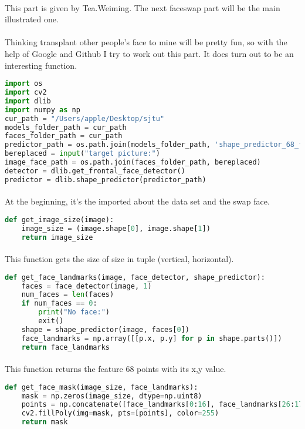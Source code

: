 \documentclass{article}
\begin{document}
	    	\paragraph{}This part is given by Tea.Weiming. The next faceswap part will be the main illustrated one. 
		\paragraph{}Thinking transplant other people's face to mine will be pretty fun, so with the help of Google and Github I try to work out this part. It does turn out to be an interesting function. 
	      \begin{lstlisting}[language=Python]
import os
import cv2
import dlib
import numpy as np
cur_path = "/Users/apple/Desktop/sjtu"
models_folder_path = cur_path
faces_folder_path = cur_path
predictor_path = os.path.join(models_folder_path, 'shape_predictor_68_face_landmarks.dat')
bereplaced = input("target picture:")
image_face_path = os.path.join(faces_folder_path, bereplaced)  
detector = dlib.get_frontal_face_detector()
predictor = dlib.shape_predictor(predictor_path)
		\end{lstlisting}
		\paragraph{}At the beginning, it's the imported about the data set and the swap face.
		\begin{lstlisting}[language=Python]
def get_image_size(image):
    image_size = (image.shape[0], image.shape[1])
    return image_size
		\end{lstlisting}
		\paragraph{}This function gets the size of size in tuple (vertical, horizontal). 
		\begin{lstlisting}[language=Python]
def get_face_landmarks(image, face_detector, shape_predictor):
    faces = face_detector(image, 1)
    num_faces = len(faces)
    if num_faces == 0:
        print("No face:")
        exit()
    shape = shape_predictor(image, faces[0])
    face_landmarks = np.array([[p.x, p.y] for p in shape.parts()])
    return face_landmarks
		\end{lstlisting}
		\paragraph{}This function returns the feature 68 points with its x,y value. 
		\begin{lstlisting}[language=Python]
def get_face_mask(image_size, face_landmarks):
    mask = np.zeros(image_size, dtype=np.uint8)
    points = np.concatenate([face_landmarks[0:16], face_landmarks[26:17:-1]])
    cv2.fillPoly(img=mask, pts=[points], color=255)
    return mask
		\end{lstlisting}
\end{document}
